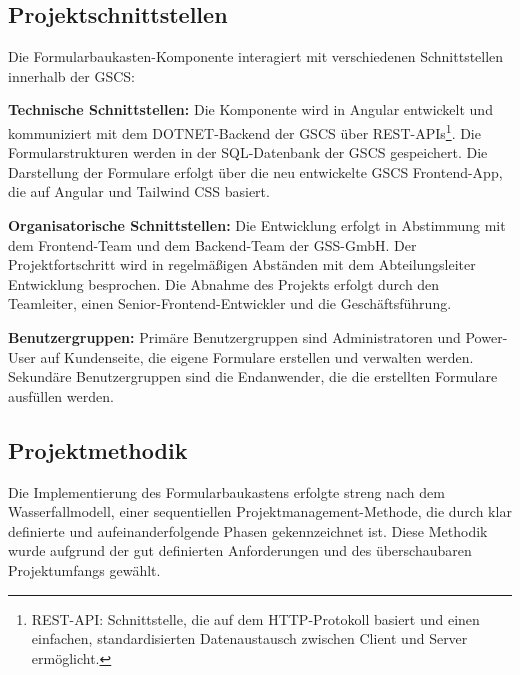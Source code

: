 \documentclass[a4paper,11pt]{article}
\begin{document}
\subsection{Projektschnittstellen}

Die Formularbaukasten-Komponente interagiert mit verschiedenen Schnittstellen innerhalb der GSCS:

\noindent \textbf{Technische Schnittstellen:} Die Komponente wird in Angular entwickelt und kommuniziert mit dem DOTNET-Backend der GSCS über REST-APIs\footnote{REST-API: Schnittstelle, die auf dem HTTP-Protokoll basiert und einen einfachen, standardisierten Datenaustausch zwischen Client und Server ermöglicht.}. Die Formularstrukturen werden in der SQL-Datenbank der GSCS gespeichert. Die Darstellung der Formulare erfolgt über die neu entwickelte GSCS Frontend-App, die auf Angular und Tailwind CSS basiert.


\noindent \textbf{Organisatorische Schnittstellen:} Die Entwicklung erfolgt in Abstimmung mit dem Frontend-Team und dem Backend-Team der GSS-GmbH. Der Projektfortschritt wird in regelmäßigen Abständen mit dem Abteilungsleiter Entwicklung besprochen. Die Abnahme des Projekts erfolgt durch den Teamleiter, einen Senior-Frontend-Entwickler und die Geschäftsführung.

\noindent \textbf{Benutzergruppen:} Primäre Benutzergruppen sind Administratoren und Power-User auf Kundenseite, die eigene Formulare erstellen und verwalten werden. Sekundäre Benutzergruppen sind die Endanwender, die die erstellten Formulare ausfüllen werden.

\subsection{Projektmethodik}
Die Implementierung des Formularbaukastens erfolgte streng nach dem Wasserfallmodell, einer sequentiellen Projektmanagement-Methode, die durch klar definierte und aufeinanderfolgende Phasen gekennzeichnet ist. Diese Methodik wurde aufgrund der gut definierten Anforderungen und des überschaubaren Projektumfangs gewählt.
\end{document}
